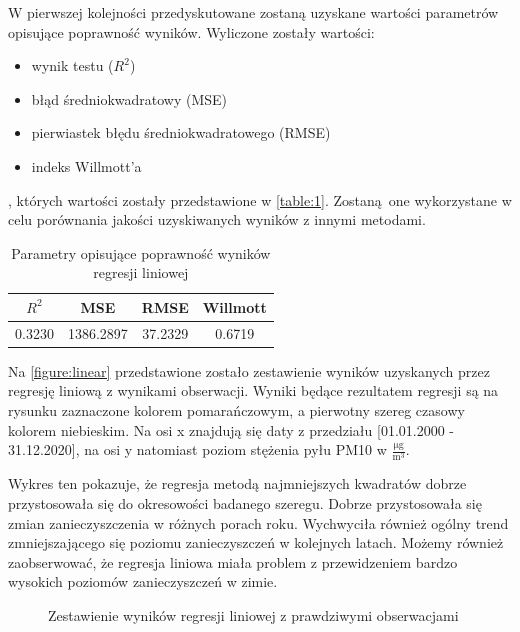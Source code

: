 \documentclass[10pt,a4paper]{article}
\begin{document}
W pierwszej kolejności przedyskutowane zostaną uzyskane wartości parametrów opisujące poprawność wyników. Wyliczone zostały wartości:
\begin{center}
	\begin{itemize}
		\item wynik testu ($R^2$)
		\item błąd średniokwadratowy (MSE)
		\item pierwiastek błędu średniokwadratowego (RMSE)
		\item indeks Willmott'a
	\end{itemize}
\end{center}
, których wartości zostały przedstawione w \autoref{table:1}. Zostaną one wykorzystane w celu porównania jakości uzyskiwanych wyników z innymi metodami.
\begin{table}[h!]
	\centering
	\begin{tabular}{|c|c|c|c|}
		\hline
		$R^2$ & MSE & RMSE & Willmott \\
		\hline
		0.3230 &1386.2897 & 37.2329 & 0.6719 \\
		\hline
	\end{tabular}
		\caption{Parametry opisujące poprawność wyników regresji liniowej}
		\label{table:1}
\end{table}

Na \autoref{figure:linear} przedstawione zostało zestawienie wyników uzyskanych przez regresję liniową z wynikami obserwacji. Wyniki będące rezultatem regresji są na rysunku zaznaczone kolorem pomarańczowym, a pierwotny szereg czasowy kolorem niebieskim. Na osi x znajdują się daty z przedziału [01.01.2000 - 31.12.2020], na osi y natomiast poziom stężenia pyłu PM10 w $\frac{\si{\micro\gram}}{\si\meter^3}$. 

Wykres ten pokazuje, że regresja metodą najmniejszych kwadratów dobrze przystosowała się do okresowości badanego szeregu. Dobrze przystosowała się zmian zanieczyszczenia w różnych porach roku. Wychwyciła również ogólny trend zmniejszającego się poziomu zanieczyszczeń w kolejnych latach. Możemy również zaobserwować, że regresja liniowa miała problem z przewidzeniem bardzo wysokich poziomów zanieczyszczeń w zimie. 

\begin{figure}[!ht]
	\centering
	\caption{Zestawienie wyników regresji liniowej z prawdziwymi obserwacjami}
	\label{figure:linear}
\end{figure}
\FloatBarrier
\end{document}

